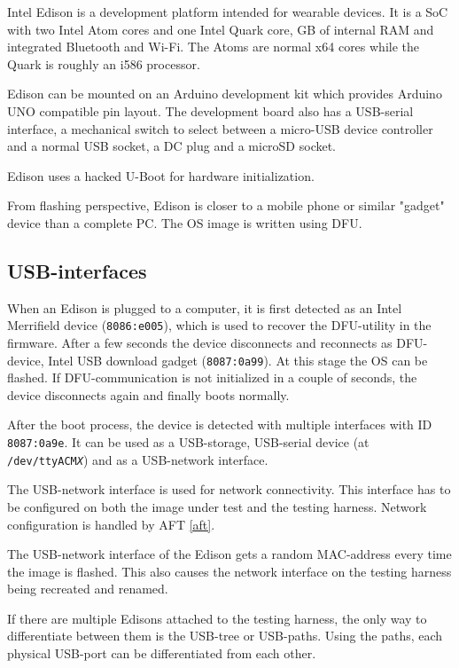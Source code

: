 \documentclass[a4paper,11pt]{article}
\newcommand{\cmd}[1]{\texttt{#1}}
\begin{document}
Intel Edison is a development platform intended for wearable devices. It is a SoC with two Intel Atom cores and one Intel Quark core, GB of internal RAM and integrated Bluetooth and Wi-Fi. The Atoms are normal x64 cores while the Quark is roughly an i586 processor.

Edison can be mounted on an Arduino development kit which provides Arduino UNO compatible pin layout. The development board also has a USB-serial interface, a mechanical switch to select between a micro-USB device controller  and a normal USB socket, a DC plug and a microSD socket.

Edison uses a hacked U-Boot for hardware initialization. 

From flashing perspective, Edison is closer to a mobile phone or similar "gadget" device than a complete PC. The OS image is written using DFU.

\subsection{USB-interfaces}

When an Edison is plugged to a computer, it is first detected as an Intel Merrifield device (\cmd{8086:e005}), which is used to recover the DFU-utility in the firmware. After a few seconds the device disconnects and reconnects as DFU-device, Intel USB download gadget (\cmd{8087:0a99}).  At this stage the OS can be flashed. If DFU-communication is not initialized in a couple of seconds, the device disconnects again and finally boots normally. 

After the boot process, the device is detected with multiple interfaces with ID \cmd{8087:0a9e}. It can be used as a USB-storage, USB-serial device (at \cmd{/dev/ttyACM\textit{X}}) and as a USB-network interface.

The USB-network interface is used for network connectivity. This interface has to be configured on both the image under test and the testing harness. Network configuration is handled by AFT \ref{aft}.

The USB-network interface of the Edison gets a random MAC-address every time the image is flashed. This also causes the network interface on the testing harness being recreated and renamed.

If there are multiple Edisons attached to the testing harness, the only way to differentiate between them is the USB-tree or USB-paths. Using the paths, each physical USB-port can be differentiated from each other.
\end{document}

